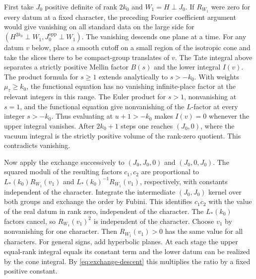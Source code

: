 First take \(J_0\) positive definite of rank \(2k_0\) and \(W_1=H\perp J_0\).
If \(R_{W_1}\) were zero for every datum at a fixed character, the preceding
Fourier coefficient argument would give vanishing on all standard data
on the large side for \((H^{2k_0}\perp W_1,J_0^{\mathrm{opp}}\perp W_1)\).
The vanishing descends one plane at a time. For any datum \(v\) below,
place a smooth cutoff on a small region of the isotropic cone and take
the slices there to be compact-group translates of \(v\). The Tate integral
above separates a strictly positive Mellin factor \(B(s)\) and the lower
integral \(I(v)\). The product formula for \(s\ge1\) extends analytically
to \(s>-k_0\). With weights \(\mu_\tau\ge k_0\), the functional equation
has no vanishing infinite-place factor at the relevant integers in this range.
The Euler product for \(s>1\), nonvanishing at \(s=1\), and the functional
equation give nonvanishing of the \(L\)-factor at every integer \(s>-k_0\).
Thus evaluating at \(u+1>-k_0\) makes \(I(v)=0\) whenever the upper
integral vanishes. After \(2k_0+1\) steps one reaches \((J_0,0)\), where the
vacuum integral is the strictly positive volume of the rank-zero quotient.
This contradicts vanishing.

Now apply the exchange successively to \((J_0,J_0,0)\) and \((J_0,0,J_0)\).
The squared moduli of the resulting factors \(c_1,c_2\) are proportional
to \(L_*(k_0)R_{W_1}(v_1)\) and \(L_*(k_0)^{-1}R_{W_1}(v_1)\), respectively,
with constants independent of the character. Integrate the intermediate
\((J_0,J_0)\) kernel over both groups and exchange the order by Fubini.
This identifies \(c_1c_2\) with the value of the real datum in rank zero,
independent of the character. The \(L_*(k_0)\) factors cancel, so
\(R_{W_1}(v_1)^2\) is independent of the character. Choose \(v_1\) by
nonvanishing for one character. Then \(R_{W_1}(v_1)>0\) has the same value
for all characters.
For general signs, add hyperbolic planes. At each stage the upper equal-rank
integral equals its constant term and the lower datum can be realized by
the cone integral. By \eqref{eq:exchange-descent} this multiplies the ratio
by a fixed positive constant.

